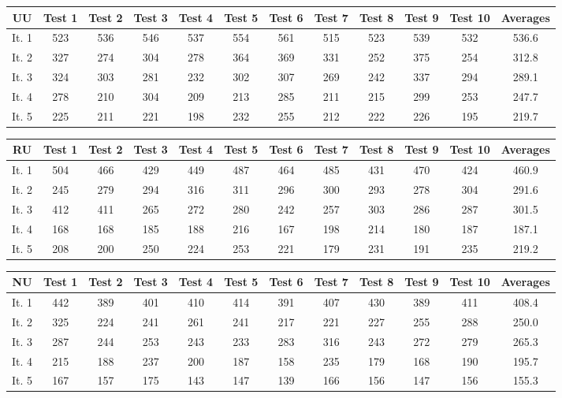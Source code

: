 \documentclass{article}
\begin{document}
\begin{center}
	\begin{tabular}{c||c|c|c|c|c|c|c|c|c|c||c}
		UU&Test 1&Test 2&Test 3&Test 4&Test 5&Test 6&Test 7&Test 8&Test 9&Test 10&Averages\\
		\hline\hline
		It. 1&523&536&546&537&554&561&515&523&539&532&536.6\\
		It. 2&327&274&304&278&364&369&331&252&375&254&312.8\\
		It. 3&324&303&281&232&302&307&269&242&337&294&289.1\\
		It. 4&278&210&304&209&213&285&211&215&299&253&247.7\\
		It. 5&225&211&221&198&232&255&212&222&226&195&219.7\\
	\end{tabular}
\end{center}
\begin{center}
	\begin{tabular}{c||c|c|c|c|c|c|c|c|c|c||c}
		RU&Test 1&Test 2&Test 3&Test 4&Test 5&Test 6&Test 7&Test 8&Test 9&Test 10&Averages\\
		\hline\hline
		It. 1&504&466&429&449&487&464&485&431&470&424&460.9\\
		It. 2&245&279&294&316&311&296&300&293&278&304&291.6\\
		It. 3&412&411&265&272&280&242&257&303&286&287&301.5\\
		It. 4&168&168&185&188&216&167&198&214&180&187&187.1\\
		It. 5&208&200&250&224&253&221&179&231&191&235&219.2\\
	\end{tabular}
\end{center}
\begin{center}
	\begin{tabular}{c||c|c|c|c|c|c|c|c|c|c||c}
		NU&Test 1&Test 2&Test 3&Test 4&Test 5&Test 6&Test 7&Test 8&Test 9&Test 10&Averages\\
		\hline\hline
		It. 1&442&389&401&410&414&391&407&430&389&411&408.4\\
		It. 2&325&224&241&261&241&217&221&227&255&288&250.0\\
		It. 3&287&244&253&243&233&283&316&243&272&279&265.3\\
		It. 4&215&188&237&200&187&158&235&179&168&190&195.7\\
		It. 5&167&157&175&143&147&139&166&156&147&156&155.3\\
	\end{tabular}
\end{center}
\end{document}
